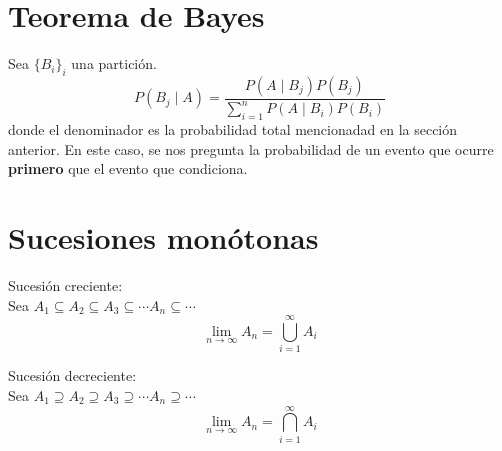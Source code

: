 \section{Teorema de Bayes}
Sea $\{B_i\}_i$ una partición.
$$P(B_j \mid A) = \frac{P(A \mid B_j)P(B_j)}{\sum_{i = 1}^n P(A \mid B_i)P(B_i)}$$
donde el denominador es la probabilidad total mencionadad en la sección anterior. En este caso, se nos pregunta la probabilidad de un evento que ocurre \textbf{primero} que el evento que condiciona.

\section{Sucesiones monótonas}
Sucesión creciente:\\
Sea $A_1 \subseteq A_2 \subseteq A_3 \subseteq \cdots A_n \subseteq \cdots$
$$\lim_{n \rightarrow \infty} A_n = \bigcup_{i=1}^{\infty} A_i$$

\noindent Sucesión decreciente:\\
Sea $A_1 \supseteq A_2 \supseteq A_3 \supseteq \cdots A_n \supseteq \cdots$
$$\lim_{n \rightarrow \infty} A_n = \bigcap_{i=1}^{\infty} A_i$$

